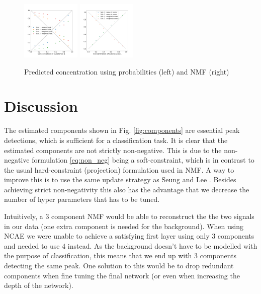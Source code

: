 \documentclass{article}
\begin{document}
\begin{figure}[H]
	\includegraphics[width=0.25\textwidth]{DNN_pred_conc_prob_2.png} \hspace*{-.5cm}
	\includegraphics[width=0.25\textwidth]{nmf_pred_conc_2.png}
	\caption{Predicted concentration using probabilities (left) and NMF (right)}
	\label{fig:comparison}
\end{figure}
\section{Discussion}
\label{sec:discussion}
The estimated components shown in Fig. \ref{fig:components} are essential peak detections, which is sufficient for a classification task. It is clear that the estimated components are not strictly non-negative. This is due to the non-negative formulation \eqref{eq:non_neg} being a soft-constraint, which is in contrast to the usual hard-constraint (projection) formulation used in NMF. A way to improve this is to use the same update strategy as Seung and Lee \cite{Seung1999}. Besides achieving strict non-negativity this also has the advantage that we decrease the number of hyper parameters that has to be tuned.

Intuitively, a 3 component NMF would be able to reconstruct the the two signals in our data (one extra component is needed for the background). When using NCAE we were unable to achieve a satisfying first layer using only 3 components and needed to use 4 instead. As the background doesn't have to be modelled with the purpose of classification, this means that we end up with 3 components detecting the same peak. One solution to this would be to drop redundant components when fine tuning the final network (or even when increasing the depth of the network).
\end{document}
